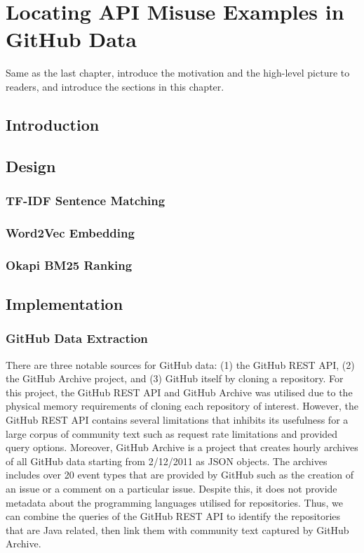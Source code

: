 \chapter{Locating API Misuse Examples in GitHub Data}
\label{cha:infoRetrieval}
Same as the last chapter, introduce the motivation and the high-level picture to
readers, and introduce the sections in this chapter.

\section{Introduction}
\label{sec:info-intro}

\section{Design}
\label{sec:info-design}
\subsection{TF-IDF Sentence Matching}
\label{subsec:info-tfidf}
\subsection{Word2Vec Embedding}
\label{subsec:info-w2v}
\subsection{Okapi BM25 Ranking}
\label{subsec:info-bm25}

\section{Implementation}
\label{sec:info-implement}


\subsection{GitHub Data Extraction}
\label{subsec:info-github-extract}
There are three notable sources for GitHub data: (1) the GitHub REST API, (2) the GitHub Archive project, and (3) GitHub itself by cloning a repository. For this project, the GitHub REST API and GitHub Archive was utilised due to the physical memory requirements of cloning each repository of interest. However, the GitHub REST API contains several limitations that inhibits its usefulness for a large corpus of community text such as request rate limitations and provided query options. Moreover, GitHub Archive is a project that creates hourly archives of all GitHub data starting from 2/12/2011 as JSON objects. The archives includes over 20 event types that are provided by GitHub such as the creation of an issue or a comment on a particular issue. Despite this, it does not provide metadata about the programming languages utilised for repositories. Thus, we can combine the queries of the GitHub REST API to identify the repositories that are Java related, then link them with community text captured by GitHub Archive.\\ 

